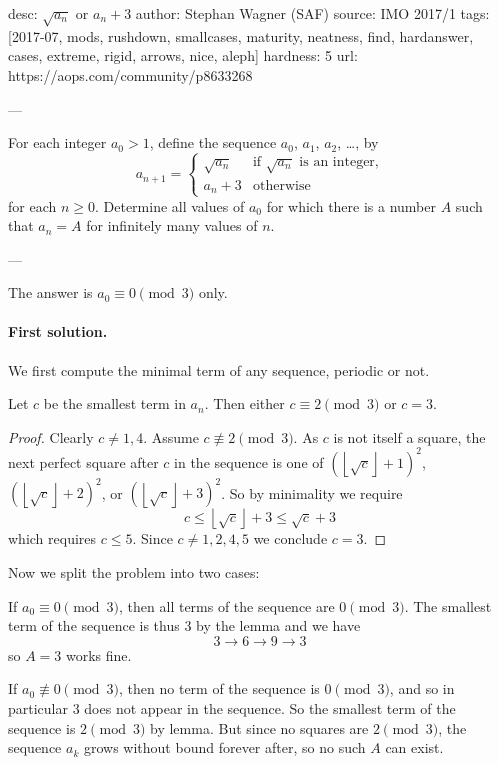 desc: $\sqrt{a_n}$ or $a_n+3$
author: Stephan Wagner (SAF)
source: IMO 2017/1
tags: [2017-07, mods, rushdown, smallcases, maturity, neatness, find, hardanswer,
cases, extreme, rigid, arrows, nice, aleph]
hardness: 5
url: https://aops.com/community/p8633268

---

For each integer $a_0 > 1$, define the sequence $a_0$, $a_1$, $a_2$,
\dots, by
\[
  a_{n+1} =
  \begin{cases}
    \sqrt{a_n} & \text{if $\sqrt{a_n}$ is an integer,} \\
    a_n + 3 & \text{otherwise}
  \end{cases}
\]
for each $n \ge 0$.
Determine all values of $a_0$ for which there is a number $A$
such that $a_n = A$ for infinitely many values of $n$.

---

The answer is $a_0 \equiv 0 \pmod 3$ only.

\paragraph{First solution.}
We first compute the minimal term of any sequence, periodic or not.

\begin{lemma*}
  Let $c$ be the smallest term in $a_n$.
  Then either $c \equiv 2 \pmod 3$ or $c = 3$.
\end{lemma*}
\begin{proof}
  Clearly $c \neq 1, 4$.
  Assume $c \not\equiv 2 \pmod 3$.
  As $c$ is not itself a square,
  the next perfect square after $c$ in the sequence
  is one of $\left( \left\lfloor \sqrt c \right\rfloor + 1\right)^2$,
  $\left( \left\lfloor \sqrt c \right\rfloor + 2\right)^2$,
  or $\left( \left\lfloor \sqrt c \right\rfloor + 3\right)^2$.
  So by minimality we require
  \[ c \le \left\lfloor \sqrt c \right\rfloor + 3 \le \sqrt c + 3 \]
  which requires $c \le 5$.
  Since $c \neq 1,2,4,5$ we conclude $c = 3$.
\end{proof}

Now we split the problem into two cases:

\begin{itemize}
\ii If $a_0 \equiv 0 \pmod 3$, then all terms of the sequence are $0 \pmod 3$.
The smallest term of the sequence is thus $3$ by the lemma
and we have \[ 3 \to 6 \to 9 \to 3 \]
so $A = 3$ works fine.

\ii If $a_0 \not\equiv 0 \pmod 3$,
then no term of the sequence is $0 \pmod 3$,
and so in particular $3$ does not appear in the sequence.
So the smallest term of the sequence is $2 \pmod 3$ by lemma.
But since no squares are $2 \pmod 3$,
the sequence $a_k$ grows without bound forever after,
so no such $A$ can exist.
\end{itemize}

